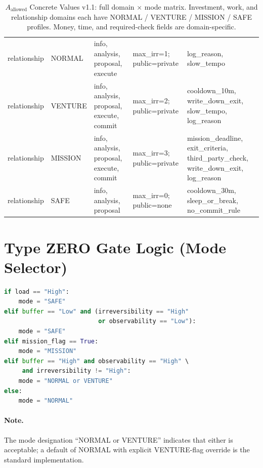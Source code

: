 \begin{table}[ht]
\begin{tabularx}{\linewidth}{llXXX}
\midrule

relationship & NORMAL
& info, analysis, proposal, execute
& max\_irr=1; public=private
& log\_reason, slow\_tempo \\

relationship & VENTURE
& info, analysis, proposal, execute, commit
& max\_irr=2; public=private
& cooldown\_10m, write\_down\_exit, slow\_tempo, log\_reason \\

relationship & MISSION
& info, analysis, proposal, execute, commit
& max\_irr=3; public=private
& mission\_deadline, exit\_criteria, third\_party\_check,
write\_down\_exit, log\_reason \\

relationship & SAFE
& info, analysis, proposal
& max\_irr=0; public=none
& cooldown\_30m, sleep\_or\_break, no\_commit\_rule \\

\bottomrule
\end{tabularx}
\caption[Concrete values v1.1 matrix]{$A_{\mathrm{allowed}}$
Concrete Values v1.1: full domain $\times$ mode matrix. Investment,
work, and relationship domains each have NORMAL / VENTURE / MISSION /
SAFE profiles. Money, time, and required-check fields are
domain-specific.}
\label{tab:a-allowed-concrete-matrix}
\end{table}

\section{Type ZERO Gate Logic (Mode Selector)}
\label{sec:a-allowed-gate-logic}

\begin{lstlisting}[language=Python,basicstyle=\ttfamily\small,frame=single]
if load == "High":
    mode = "SAFE"
elif buffer == "Low" and (irreversibility == "High"
                          or observability == "Low"):
    mode = "SAFE"
elif mission_flag == True:
    mode = "MISSION"
elif buffer == "High" and observability == "High" \
     and irreversibility != "High":
    mode = "NORMAL or VENTURE"
else:
    mode = "NORMAL"
\end{lstlisting}

\paragraph{Note.}
The mode designation ``NORMAL or VENTURE'' indicates that either is
acceptable; a default of NORMAL with explicit VENTURE-flag override
is the standard implementation.

